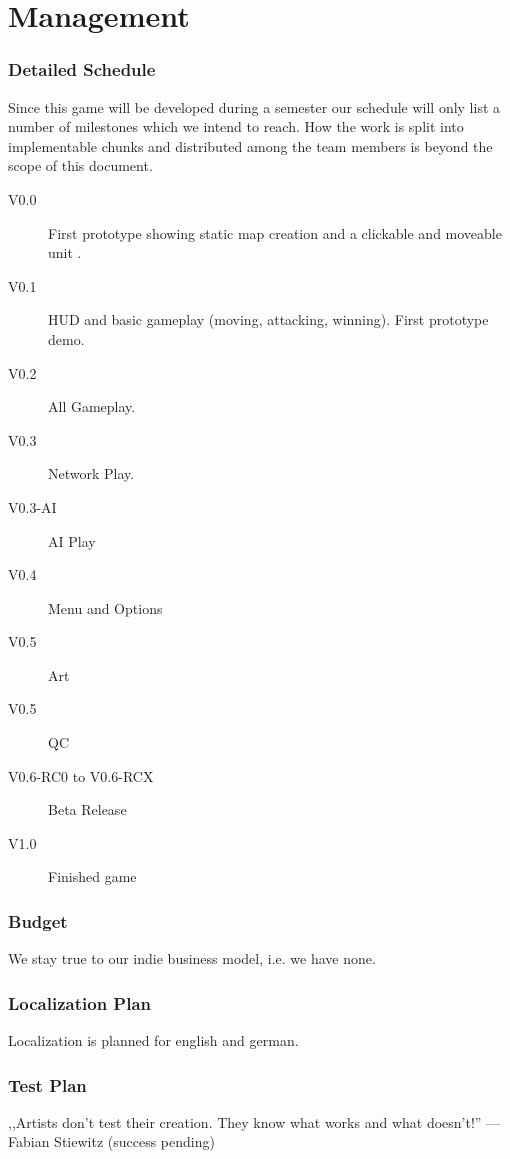 \part{Management}
\section{Detailed Schedule}
Since this game will be developed during a semester our schedule will only list
a number of milestones which we intend to reach. How the work is split into implementable
chunks and distributed among the team members is beyond the scope of this document.
\label{timetable}
\begin{description}
    \item[V0.0] First prototype showing static map creation and a clickable and moveable unit .
    \item[V0.1] HUD and basic gameplay (moving, attacking, winning). First prototype demo.
    \item[V0.2] All Gameplay.
    \item[V0.3] Network Play.
    \item[V0.3-AI] AI Play
    \item[V0.4] Menu and Options
    \item[V0.5] Art
    \item[V0.5] QC
    \item[V0.6-RC0 to V0.6-RCX] Beta Release
    \item[V1.0] Finished game
\end{description}
\section{Budget}
We stay true to our indie business model, i.e. we have none.
\section{Localization Plan}
Localization is planned for english and german.
\section{Test Plan}
,,Artists don't test their creation. They know what works and what doesn't!'' --- Fabian Stiewitz (success pending)
